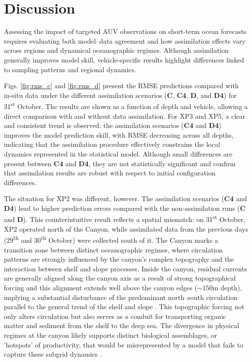 \section{Discussion}
\label{sec:disc}

Assessing the impact of targeted AUV observations on short-term ocean
forecasts requires evaluating both model–data agreement and how
assimilation effects vary across regions and dynamical oceanographic
regimes. Although assimilation generally improves model skill,
vehicle-specific results highlight differences linked to sampling
patterns and regional dynamics.

Figs. \ref{fig:rms_c} and \ref{fig:rms_d} present the RMSE predictions
compared with in-situ data under the different assimilation scenarios
(\textbf{C}, \textbf{C4}, \textbf{D}, and \textbf{D4}) for
31\textsuperscript{st} October. The results are shown as a function of
depth and vehicle, allowing a direct comparison with and without data
assimilation.  For XP3 and XP5, a clear and consistent trend is
observed: the assimilation scenarios (\textbf{C4} and \textbf{D4})
improves the model prediction skill, with RMSE decreasing across all
depths, indicating that the assimilation procedure effectively
constrains the local dynamics represented in the statistical
model. Although small differences are present between \textbf{C4} and
\textbf{D4}, they are not statistically significant and confirm that
assimilation results are robust with respect to initial configuration
differences.

The situation for XP2 was different, however. The assimilation
scenarios (\textbf{C4} and \textbf{D4}) lead to higher prediction
errors compared with the non-assimilation runs (\textbf{C} and
\textbf{D}). This counterintuitive result reflects a spatial mismatch:
on 31\textsuperscript{st} October, XP2 operated north of the \naz
Canyon, while assimilated data from the previous days
(29\textsuperscript{th} and 30\textsuperscript{th} October) were
collected south of it. The \naz Canyon marks a transition zone between
distinct oceanographic regimes, where circulation patterns are
strongly influenced by the canyon’s complex topography and the
interaction between shelf and slope processes. Inside the canyon,
residual currents are generally aligned along the canyon axis as a
result of strong topographical forcing and this alignment extends well
above the canyon edges ($\sim150$m depth), implying a substantial
disturbance of the predominant north–south circulation parallel to the
general trend of the shelf and slope
\parencite{tyler2009europe,relvas2007physical,guerreiro2014influence}. This
topographic forcing not only alters circulation but also serves as a
conduit for transporting organic matter and sediment from the shelf to
the deep sea. The divergence in physical regimes at the canyon likely
supports distinct biological assemblages, or 'hotspots' of
productivity, that would be misrepresented by a model that fails to
capture these subgrid dynamics \parencite{stigterr07,cunha11}.


